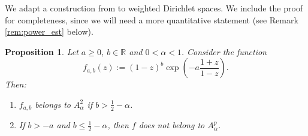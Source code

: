 \documentclass[12pt]{amsart}
\newtheorem{proposition}[theorem]{Proposition}
\theoremstyle{definition}
\newcommand{\R}{\mathbb{{R}}}
\numberwithin{equation}{section}
\begin{document}
        We adapt a construction from \cite[Prop. 16]{BS84} to weighted Dirichlet spaces. We include the proof for completeness, since we will need a more quantitative statement (see Remark \ref{rem:power_est} below).
    
        \begin{proposition} \label{Prop:BS}
            Let $a \ge 0$, $b \in \R$ and $0<\alpha<1$. Consider the function
                \[
                    f_{a, b}(z) := (1-z)^b\exp\left(-a\frac{1+z}{1-z}\right).
                \]
                Then:
                \begin{enumerate}
                    \item \label{Propi)} $f_{a, b}$ belongs to $A_\alpha^2$ if $b > \frac{1}{2} - \alpha$.
                    
                    \item \label{Propii)} If $b>-a$ and $b\le\frac{1}{2}-\alpha$, then $f$ does not belong to $A^p_\alpha$.
                \end{enumerate}
        \end{proposition}
    
\end{document}
